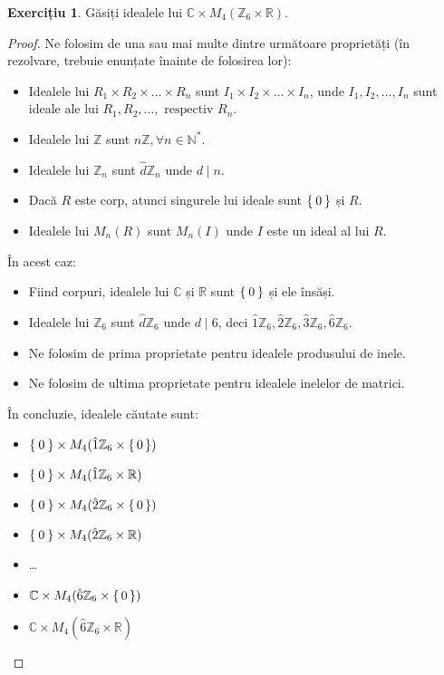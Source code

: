 \documentclass[11pt]{article}
\theoremstyle{definition}
\newtheorem*{exercise}{Exercițiu}
\begin{document}
\begin{exercise}
Găsiți idealele lui \(\mathbb{C} \times M_4(\mathbb{Z}_6 \times \mathbb{R})\).
\end{exercise}
\begin{proof}
Ne folosim de una sau mai multe dintre următoare proprietăți (în rezolvare, trebuie enunțate înainte de folosirea lor):
\begin{itemize}
    \item Idealele lui \(R_1 \times R_2 \times \dots \times R_n\) sunt \(I_1 \times I_2 \times \dots \times I_n\), unde \(I_1, I_2, \dots, I_n\) sunt ideale ale lui \(R_1, R_2, \dots, \text{ respectiv } R_n\).
    \item Idealele lui \(\mathbb{Z}\) sunt \(n\mathbb{Z}, \forall n \in \mathbb{N}^{*}\).
    \item Idealele lui \(\mathbb{Z}_n\) sunt \(\hat{d}\mathbb{Z}_n\) unde \(d \mid n\).
    \item Dacă \(R\) este corp, atunci singurele lui ideale sunt \(\Set{0}\) și \(R\).
    \item Idealele lui \(M_n(R)\) sunt \(M_n(I)\) unde \(I\) este un ideal al lui \(R\).
\end{itemize}

În acest caz:
\begin{itemize}
    \item Fiind corpuri, idealele lui \(\mathbb{C}\) și \(\mathbb{R}\) sunt \(\Set{0}\) și ele însăși.
    \item Idealele lui \(\mathbb{Z}_6\) sunt \(\hat{d}\mathbb{Z}_6\) unde \(d \mid 6\), deci \(\hat{1}\mathbb{Z}_6, \hat{2}\mathbb{Z}_6, \hat{3}\mathbb{Z}_6, \hat{6}\mathbb{Z}_6\).
    \item Ne folosim de prima proprietate pentru idealele produsului de inele.
    \item Ne folosim de ultima proprietate pentru idealele inelelor de matrici.
\end{itemize}

În concluzie, idealele căutate sunt:
\begin{itemize}
    \item \(\Set{0} \times M_4(\hat{1} \mathbb{Z}_6 \times \set{0})\)
    \item \(\Set{0} \times M_4(\hat{1} \mathbb{Z}_6 \times \mathbb{R})\)
    \item \(\Set{0} \times M_4(\hat{2} \mathbb{Z}_6 \times \set{0})\)
    \item \(\Set{0} \times M_4(\hat{2} \mathbb{Z}_6 \times \mathbb{R})\)
    \item \dots
    \item \(\mathbb{C} \times M_4(\hat{6} \mathbb{Z}_6 \times \set{0})\)
    \item \(\mathbb{C} \times M_4(\hat{6} \mathbb{Z}_6 \times \mathbb{R})\)
\end{itemize}
\end{proof}
\end{document}
